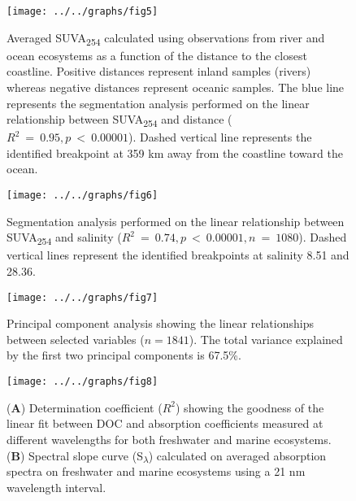 \documentclass[10pt,a4paper]{scrartcl}
\begin{document}
\clearpage
\newpage

\begin{figure}[h]
	\centering
	\texttt{[image: ../../graphs/fig5]}
	\caption{Averaged SUVA\textsubscript{254} calculated using observations from river and ocean ecosystems as a function of the distance to the closest coastline. Positive distances represent inland samples (rivers) whereas negative distances represent oceanic samples. The blue line represents the segmentation analysis performed on the linear relationship between SUVA\textsubscript{254} and distance ($R^2~=~0.95, p~<~0.00001$). Dashed vertical line represents the identified breakpoint at 359 km away from the coastline toward the ocean.}
\end{figure}

\clearpage
\newpage

\begin{figure}[h]
	\centering
	\texttt{[image: ../../graphs/fig6]}
	\caption{Segmentation analysis performed on the linear relationship between SUVA\textsubscript{254} and salinity ($R^2~=~0.74, p~<~0.00001, n~=~1080$). Dashed vertical lines represent the identified breakpoints at salinity 8.51 and 28.36.}

\end{figure}

\clearpage
\newpage

\begin{figure}[h]
	\centering
	\texttt{[image: ../../graphs/fig7]}
	\caption{Principal component analysis showing the linear relationships between selected variables ($n = 1841$). The total variance explained by the first two principal components is 67.5\%.}
\end{figure}

\clearpage
\newpage

\begin{figure}[h]
	\centering
	\texttt{[image: ../../graphs/fig8]}
	\caption{(\textbf{A}) Determination coefficient ($R^2$) showing the goodness of the linear fit between DOC and absorption coefficients measured at different wavelengths for both freshwater and marine ecosystems. (\textbf{B}) Spectral slope curve (S\textsubscript{$\lambda$}) calculated on averaged absorption spectra on freshwater and marine ecosystems using a 21 nm wavelength interval.}
\end{figure}
\end{document}
